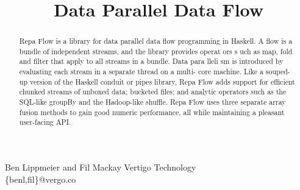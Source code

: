 \documentclass[preprint]{sigplanconf}
\begin{document}
\title          {Data Parallel Data Flow}
 

\authorinfo
{       Ben Lippmeier and Fil Mackay  }
{ \shortstack
  {     Vertigo Technology \\
        \textsf{\{benl,fil\}@vergo.co}
  }
}

\maketitle

\begin{abstract}
Repa Flow is a library for data parallel data flow programming in Haskell. A  flow is a bundle of independent streams, and the library provides operat ors s uch  as map, fold and filter that apply to all streams in a bundle. Data para lleli sm is introduced by evaluating each stream in a separate thread on a multi- core machine. Like a souped-up version of the Haskell conduit or pipes library, Repa Flow adds support for efficient chunked streams of unboxed data; bucketed files; and analytic operators such as the SQL-like groupBy and the Hadoop-like shuffle. Repa Flow uses three separate array fusion methods to gain good numeric performance, all while maintaining a pleasant user-facing API.
\end{abstract}











% 
% 
% 
\end{document}
